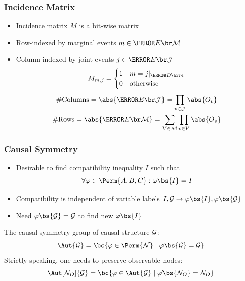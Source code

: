 \documentclass[
    hyperref={bookmarks=false},%
    xcolor={dvipsnames},
]{beamer}
\renewcommand{\term}[1]{\textcolor{Mahogany}{#1}}
\begin{document}
\begin{frame}
    \frametitle{Incidence Matrix}
    \begin{itemize}
        \item \term{Incidence matrix} $M$ is a bit-wise matrix
        \item Row-indexed by marginal events $m \in \Events{\mscenario}$
        \item Column-indexed by joint events $j \in \Events{\jointvar}$
        \[ M_{m,j} = \begin{cases}
            1 & m = j|_{\Dom{m}} \\
            0 & \text{otherwise}
        \end{cases} \]
        \begin{gather*}
        \# \text{Columns} = \abs{\Events{\jointvar}} = \prod_{v \in \jointvar} \abs{O_{v}} \\
        \# \text{Rows} = \abs{\Events{\mscenario}} = \sum_{V \in \mscenario} \prod_{v \in V} \abs{O_{v}}
        \end{gather*}

    \end{itemize}
\end{frame}


\begin{frame}
    \frametitle{Causal Symmetry}
    \begin{itemize}
        \item Desirable to find compatibility inequality $I$ such that
        \[ \forall \varphi \in \Perm{A,B,C} : \varphi\bs{I} = I \]
        \item Compatibility is independent of variable labels $I, \graph \to \varphi\bs{I}, \varphi\bs{\graph}$
        \item Need $\varphi\bs{\graph} = \graph$ to find new $\varphi\bs{I}$
    \end{itemize}
    \begin{definition}
        The \term{causal symmetry group} of causal structure $\mathcal{G}$:
        \[ \Aut{\graph} = \bc{\varphi \in \Perm{\nodes} \mid \varphi\bs{\graph} = \graph} \]
        Strictly speaking, one needs to preserve observable nodes:
        \[ \Aut[\nodes_O]{\graph} = \bc{\varphi \in \Aut{\graph} \mid \varphi\bs{\nodes_O} = \nodes_O} \]
    \end{definition}
\end{frame}
\end{document}
